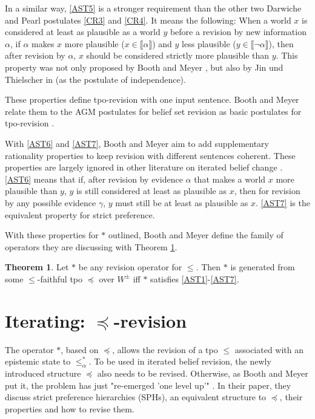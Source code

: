 \documentclass[english, 12pt]{scrartcl}
\theoremstyle{definition}
\theoremstyle{definition}
\theoremstyle{definition}
\newtheorem{theorem}{Theorem}
\newcommand{\modelsOf}[1]{\llbracket #1 \rrbracket}
\begin{document}
In a similar way, \ref{AST5} is a stronger requirement than the other two Darwiche and Pearl postulates \ref{CR3} and \ref{CR4}. It means the following: When a world $x$ is considered at least as plausible as a world $y$ before a revision by new information $\alpha$, if $\alpha$ makes $x$ more plausible ($x \in \modelsOf{\alpha}$) and $y$ less plausible ($y \in \modelsOf{\neg\alpha}$), then after revision by $\alpha$, $x$ should be considered strictly more plausible than $y$. This property was not only proposed by Booth and Meyer \cite{Booth2006a}, but also by Jin und Thielscher in \cite{Jin2007} (as the postulate of independence).

These properties define tpo-revision with one input sentence. Booth and Meyer relate them to the AGM postulates for belief set revision \cite{Alchourron1985} as basic postulates for tpo-revision \cite{Booth2011}.

With \ref{AST6} and \ref{AST7}, Booth and Meyer aim to add supplementary rationality properties to keep revision with different sentences coherent. These properties are largely ignored in other literature on iterated belief change \cite{Booth2011}. \ref{AST6} means that if, after revision by evidence $\alpha$ that makes a world $x$ more plausible than $y$, $y$ is still considered at least as plausible as $x$, then for revision by any possible evidence $\gamma$, $y$ must still be at least as plausible as $x$. \ref{AST7} is the equivalent property for strict preference.

\bigskip

With these properties for $\ast$ outlined, Booth and Meyer define the family of operators they are discussing with Theorem \ref{theorem:revision-operator}.

\begin{theorem}
\label{theorem:revision-operator}Let $\ast$ be any revision operator for $\leq$. Then $\ast$ is generated from some $\leq$-faithful tpo $\preceq$ over $W^{\pm}$ iff $\ast$ satisfies \ref{AST1}-\ref{AST7}. \cite{Booth2011}
\end{theorem}

\section{Iterating: $\preceq$-revision}
\label{section:iterating-preceq-revision}
The operator $\ast$, based on $\preceq$, allows the revision of a tpo $\leq$ associated with an epistemic state to $\leq_{\alpha}^{\ast}$. To be used in iterated belief revision, the newly introduced structure $\preceq$ also needs to be revised. Otherwise, as Booth and Meyer put it, the problem has just "re-emerged 'one level up'" \cite{Booth2011}. In their paper, they discuss strict preference hierarchies (SPHs), an equivalent structure to $\preceq$, their properties and how to revise them.
\end{document}
